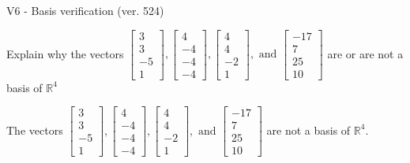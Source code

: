 \begin{exercise}
  \begin{exerciseTitle}V6 - Basis verification (ver. 524)\end{exerciseTitle}
  \begin{exerciseStatement}
    Explain why the vectors \(\left[\begin{array}{r}
3 \\
3 \\
-5 \\
1
\end{array}\right] , \left[\begin{array}{r}
4 \\
-4 \\
-4 \\
-4
\end{array}\right] , \left[\begin{array}{r}
4 \\
4 \\
-2 \\
1
\end{array}\right] , \text{ and } \left[\begin{array}{r}
-17 \\
7 \\
25 \\
10
\end{array}\right]\) are or are not a basis of \(\mathbb{R}^4\)	


  \end{exerciseStatement}
  \begin{exerciseAnswer}
   The vectors \(\left[\begin{array}{r}
3 \\
3 \\
-5 \\
1
\end{array}\right] , \left[\begin{array}{r}
4 \\
-4 \\
-4 \\
-4
\end{array}\right] , \left[\begin{array}{r}
4 \\
4 \\
-2 \\
1
\end{array}\right] , \text{ and } \left[\begin{array}{r}
-17 \\
7 \\
25 \\
10
\end{array}\right]\) 
  	 are not  a basis of \(\mathbb{R}^4\).
  


  \end{exerciseAnswer}
\end{exercise}
